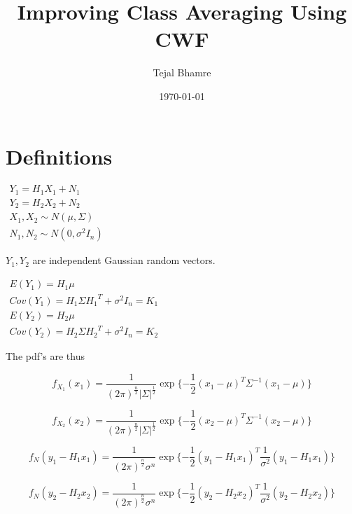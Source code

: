 \documentclass[11pt]{article} %
\title{Improving Class Averaging Using CWF}
\author{Tejal Bhamre}
\date{\today}
\begin{document}
\maketitle

\section{Definitions}

$\begin{array}{l} Y_1=H_1 X_1 + N_1 \\ Y_2=H_2 X_2 + N_2 \\ X_1, X_2  \sim N( {\mu},\Sigma) \\ N_1, N_2  \sim N(0,{\sigma}^2 I_n )\end{array}$

\vspace{4 mm}

\noindent
$Y_1, Y_2$ are independent Gaussian random vectors.


\vspace{4 mm}

$\begin{array}{l} E(Y_1)=H_1 \mu \\ Cov(Y_1) = H_1 \Sigma {H_1}^T + {\sigma}^2 I_n = K_1 \\ E(Y_2)=H_2 \mu \\ Cov(Y_2) = H_2 \Sigma {H_2}^T + {\sigma}^2 I_n = K_2 \end{array}$

\vspace{4 mm}
\noindent
The pdf's are thus

\begin{equation}
f_{X_1}(x_1) = \frac{1}{({2\pi})^{\frac{n}{2}} {|\Sigma|}^{\frac{1}{2}}} \exp\{-\frac{1}{2}{(x_1-\mu)}^T {\Sigma}^{-1}(x_1-\mu)\} 
\end{equation}

\begin{equation}
f_{X_2}(x_2) = \frac{1}{({2\pi})^{\frac{n}{2}} {|\Sigma|}^{\frac{1}{2}}} \exp\{-\frac{1}{2}{(x_2-\mu)}^T {\Sigma}^{-1}(x_2-\mu)\} 
\end{equation}

\begin{equation}
f_N(y_1-H_1 x_1) = \frac{1}{({2\pi})^{\frac{n}{2}}\sigma^n} \exp\{-\frac{1}{2}{(y_1-H_1 x_1)}^T \frac{1}{\sigma^2}(y_1-H_1 x_1)\}
\end{equation}

\begin{equation}
f_N(y_2-H_2 x_2) = \frac{1}{({2\pi})^{\frac{n}{2}}\sigma^n} \exp\{-\frac{1}{2}{(y_2-H_2 x_2)}^T \frac{1}{\sigma^2} (y_2-H_2 x_2)\}
\end{equation}
\end{document}

